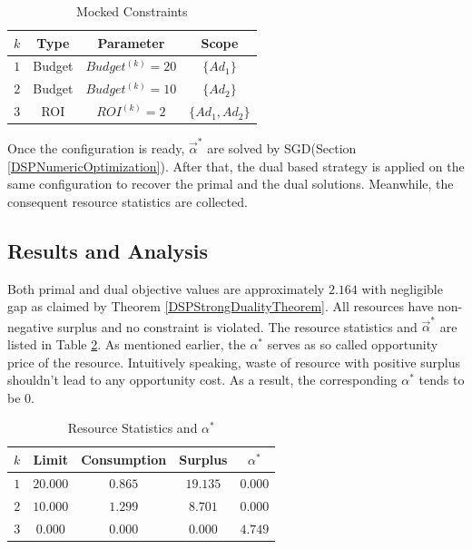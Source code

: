 \documentclass{article}
\newcommand{\valpha}{\vec{\alpha}}
\begin{document}
\begin{table}
\caption{Mocked Constraints\label{TableConstraints}}
\begin{center}
\begin{tabular}{|c|c|c|c|}
\hline
$k$ & Type            & Parameter           & Scope   \\
\hline
$1$ & Budget          & $Budget^{(k)} = 20$ & $\{Ad_1\}$        \\
\hline
$2$ & Budget          & $Budget^{(k)} = 10$ & $\{Ad_2\}$        \\
\hline
$3$ & ROI             & $ROI^{(k)} = 2$     & $\{Ad_1, Ad_2\}$  \\
\hline
\end{tabular}
\end{center}
\end{table}

Once the configuration is ready, $\valpha^*$ are solved by SGD(Section \ref{DSPNumericOptimization}).
After that, the dual based strategy is applied on the same configuration to recover the primal and the dual solutions.
Meanwhile, the consequent resource statistics are collected.

\subsection{Results and Analysis}

Both primal and dual objective values are approximately $2.164$ with negligible gap as claimed by Theorem \ref{DSPStrongDualityTheorem}.
All resources have non-negative surplus and no constraint is violated.
The resource statistics and $\valpha^*$ are listed in Table \ref{TableStatisticsAndAlpha}.
As mentioned earlier, the $\alpha^*$ serves as so called opportunity price of the resource.
Intuitively speaking, waste of resource with positive surplus shouldn't lead to any opportunity cost.
As a result, the corresponding $\alpha^*$ tends to be $0$.

\begin{table}
\caption{Resource Statistics and $\alpha^*$\label{TableStatisticsAndAlpha}}
\begin{center}
\begin{tabular}{|c|c|c|c|c|}
\hline
$k$     & Limit    & Consumption & Surplus      & $\alpha^*$ \\
\hline
$1$     & $20.000$ & $0.865$     & $19.135$     & $0.000$ \\
\hline
$2$     & $10.000$ & $1.299$     & $8.701$      & $0.000$ \\
\hline
$3$     & $0.000$  & $0.000$     & $0.000$      & $4.749$ \\
\hline
\end{tabular}
\end{center}
\end{table}
\end{document}
